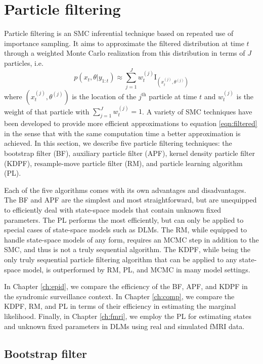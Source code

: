 \section{Particle filtering \label{sec:filtering}}

Particle filtering is an SMC inferential technique based on repeated use of importance sampling. It aims to approximate the filtered distribution at time $t$ through a weighted Monte Carlo realization from this distribution in terms of $J$ particles, i.e.
\begin{equation}
p(x_t,\theta| y_{1:t}) \approx \sum_{j=1}^J w_t^{(j)} \mbox{I}_{\left(x_t^{(j)},\theta^{(j)}\right)} \label{eqn:approx}
\end{equation}
where $\left(x_t^{(j)},\theta^{(j)}\right)$ is the location of the $j^{\mbox{th}}$ particle at time $t$ and $w_t^{(j)}$ is the weight of that particle with $\sum_{j=1}^J w_t^{(j)}=1$. A variety of SMC techniques have been developed to provide more efficient approximations to equation \eqref{eqn:filtered} in the sense that with the same computation time a better approximation is achieved. In this section, we describe five particle filtering techniques: the bootstrap filter (BF), auxiliary particle filter (APF), kernel density particle filter (KDPF), resample-move particle filter (RM), and particle learning algorithm (PL).

Each of the five algorithms comes with its own advantages and disadvantages. The BF and APF are the simplest and most straightforward, but are unequipped to efficiently deal with state-space models that contain unknown fixed parameters. The PL performs the most efficiently, but can only be applied to special cases of state-space models such as DLMs. The RM, while equipped to handle state-space models of any form, requires an MCMC step in addition to the SMC, and thus is not a truly sequential algorithm. The KDPF, while being the only truly sequential particle filtering algorithm that can be applied to any state-space model, is outperformed by RM, PL, and MCMC in many model settings.

In Chapter \ref{ch:epid}, we compare the efficiency of the BF, APF, and KDPF in the syndromic surveillance context. In Chapter \ref{ch:comp}, we compare the KDPF, RM, and PL in terms of their efficiency in estimating the marginal likelihood. Finally, in Chapter \ref{ch:fmri}, we employ the PL for estimating states and unknown fixed parameters in DLMs using real and simulated fMRI data.

\subsection{Bootstrap filter \label{sec:bf}}

